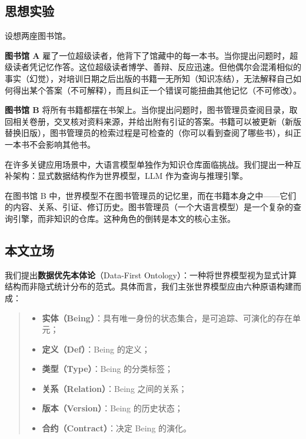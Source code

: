 \documentclass[11pt,a4paper]{ctexart}
\begin{document}
\subsection{思想实验}\label{ux601dux60f3ux5b9eux9a8c}

设想两座图书馆。

\textbf{图书馆 A}
雇了一位超级读者，他背下了馆藏中的每一本书。当你提出问题时，超级读者凭记忆作答。这位超级读者博学、善辩、反应迅速。但他偶尔会混淆相似的事实（幻觉），对培训日期之后出版的书籍一无所知（知识冻结），无法解释自己如何得出某个答案（不可解释），而且纠正一个错误可能扭曲其他记忆（不可修改）。

\textbf{图书馆 B}
将所有书籍都摆在书架上。当你提出问题时，图书管理员查阅目录，取回相关卷册，交叉核对资料来源，并给出附有引证的答案。书籍可以被更新（新版替换旧版），图书管理员的检索过程是可检查的（你可以看到查阅了哪些书），纠正一本书不会影响其他书。

在许多关键应用场景中，大语言模型单独作为知识仓库面临挑战。我们提出一种互补架构：显式数据结构作为世界模型，LLM
作为查询与推理引擎。

在图书馆 B
中，世界模型不在图书管理员的记忆里，而在书籍本身之中------它们的内容、关系、引证、修订历史。图书管理员（一个大语言模型）是一个复杂的查询引擎，而非知识的仓库。这种角色的倒转是本文的核心主张。

\subsection{本文立场}\label{ux672cux6587ux7acbux573a}

我们提出\textbf{数据优先本体论}（Data-First
Ontology）：一种将世界模型视为显式计算结构而非隐式统计分布的范式。具体而言，我们主张世界模型应由六种原语构建而成：

\begin{quote}
\begin{itemize}
\tightlist
\item
  \textbf{实体（Being）}：具有唯一身份的状态集合，是可追踪、可演化的存在单元；
\item
  \textbf{定义（Def）}：Being 的定义；
\item
  \textbf{类型（Type）}：Being 的分类标签；
\item
  \textbf{关系（Relation）}：Being 之间的关系；
\item
  \textbf{版本（Version）}：Being 的历史状态；
\item
  \textbf{合约（Contract）}：决定 Being 的演化。
\end{itemize}
\end{quote}
\end{document}
